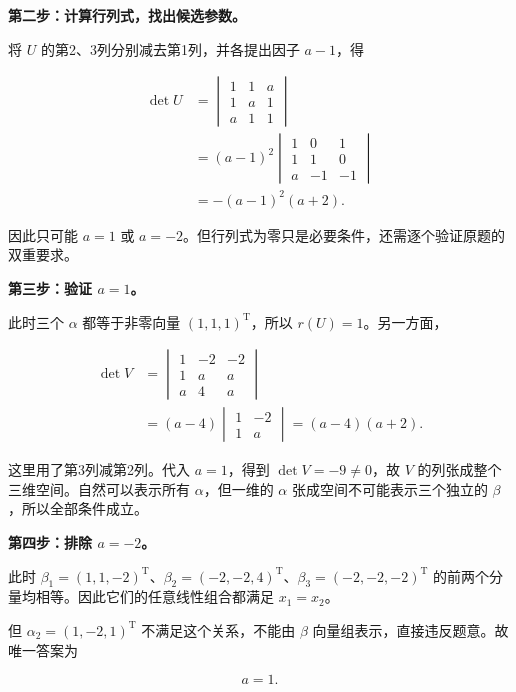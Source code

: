 \documentclass[UTF8,11pt,fontset=windows]{ctexart}
\begin{document}
\textbf{第二步：计算行列式，找出候选参数。}

将 $U$ 的第2、3列分别减去第1列，并各提出因子 $a-1$，得

$$
\begin{aligned}
\det U
&=\begin{vmatrix}1&1&a\\1&a&1\\a&1&1\end{vmatrix}\\
&=(a-1)^2\begin{vmatrix}1&0&1\\1&1&0\\a&-1&-1\end{vmatrix}\\
&=-(a-1)^2(a+2).
\end{aligned}
$$

因此只可能 $a=1$ 或 $a=-2$。但行列式为零只是必要条件，还需逐个验证原题的双重要求。

\textbf{第三步：验证 $a=1$。}

此时三个 $\alpha$ 都等于非零向量 $(1,1,1)^{\mathrm T}$，所以 $r(U)=1$。另一方面，

$$
\begin{aligned}
\det V
&=\begin{vmatrix}1&-2&-2\\1&a&a\\a&4&a\end{vmatrix}\\
&=(a-4)\begin{vmatrix}1&-2\\1&a\end{vmatrix}
=(a-4)(a+2).
\end{aligned}
$$

这里用了第3列减第2列。代入 $a=1$，得到 $\det V=-9\ne0$，故 $V$ 的列张成整个三维空间。自然可以表示所有 $\alpha$，但一维的 $\alpha$ 张成空间不可能表示三个独立的 $\beta$，所以全部条件成立。

\textbf{第四步：排除 $a=-2$。}

此时 $\beta_1=(1,1,-2)^{\mathrm T}$、$\beta_2=(-2,-2,4)^{\mathrm T}$、$\beta_3=(-2,-2,-2)^{\mathrm T}$ 的前两个分量均相等。因此它们的任意线性组合都满足 $x_1=x_2$。

但 $\alpha_2=(1,-2,1)^{\mathrm T}$ 不满足这个关系，不能由 $\beta$ 向量组表示，直接违反题意。故唯一答案为

$$
\boxed{a=1.}
$$

\clearpage
\end{document}
